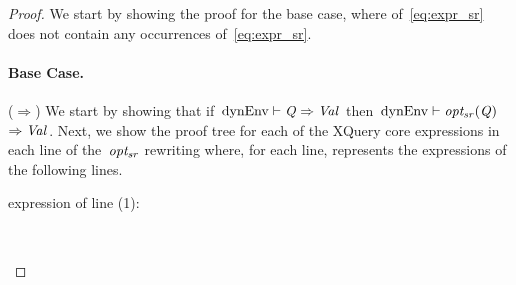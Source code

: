 \begin{proof}
  We start by showing the proof for the base case, where \ExprSingle of~\eqref{eq:expr_sr} does not contain any
  occurrences of~\eqref{eq:expr_sr}.
  \paragraph*{Base Case.}
  ($\Rightarrow$)
  We start by showing that if~${\textrm{dynEnv}} \vdash {\textit{\ensuremath{\mathit{{Q}_{}}}}} \Rightarrow \mathit{{Val}_{}}$ then~${\textrm{dynEnv}} \vdash \mathit{opt_{sr}}\!\left(\mathit{{Q}_{}}\right)$~$\Rightarrow \mathit{{Val}_{}}$.
  Next, we show the proof tree for each of the XQuery core expressions in each line of the~$\mathit{opt_{sr}}$
  rewriting where, for each line,  represents the expressions of the following lines.
  \begin{description}
  \item[\LET expression of line (1):]~
    \begin{prooftreefunction}
      
      

\end{prooftreefunction}
\end{description}
\end{proof}
